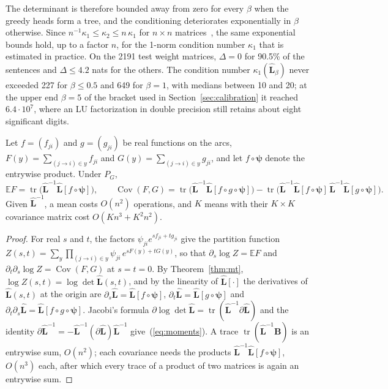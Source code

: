 \documentclass[mathematics,article,submit,pdftex,oneauthor]{Definitions/mdpi}
\newcommand{\E}{\mathbb E}
\newcommand{\Lh}{\hat{\mathbf L}}
\newcommand{\Cov}{\operatorname{Cov}}
\newcommand{\tr}{\operatorname{tr}}
\begin{document}
The determinant is therefore bounded away from zero for every $\beta$ when the greedy heads form a tree, and the conditioning deteriorates exponentially in $\beta$ otherwise.
Since $n^{-1}\kappa_1\leqslant\kappa_2\leqslant n\,\kappa_1$ for $n\times n$ matrices~\cite{Higham2002}, the same exponential bounds hold, up to a factor $n$, for the 1-norm condition number $\kappa_1$ that is estimated in practice.
On the 2191 test weight matrices, $\Delta=0$ for 90.5\% of the sentences and $\Delta\leqslant4.2$ nats for the others.
The condition number $\kappa_1(\Lh_\beta)$ never exceeded 227 for $\beta\leqslant0.5$ and 649 for $\beta=1$, with medians between 10 and 20; at the upper end $\beta=5$ of the bracket used in Section~\ref{sec:calibration} it reached $6.4\cdot10^{7}$, where an LU factorization in double precision still retains about eight significant digits.

\begin{Proposition}\label{prop:moments}
Let $f=(f_{ji})$ and $g=(g_{ji})$ be real functions on the arcs, $F(y)=\sum_{(j\to i)\in y}f_{ji}$ and $G(y)=\sum_{(j\to i)\in y}g_{ji}$, and let $f\circ\boldsymbol\psi$ denote the entrywise product.
Under $P_G$,
\begin{equation}\label{eq:moments}
\E F=\tr\bigl(\Lh^{-1}\Lh[f\circ\boldsymbol\psi]\bigr),\qquad
\Cov(F,G)=\tr\bigl(\Lh^{-1}\Lh[f\circ g\circ\boldsymbol\psi]\bigr)-\tr\bigl(\Lh^{-1}\Lh[f\circ\boldsymbol\psi]\,\Lh^{-1}\Lh[g\circ\boldsymbol\psi]\bigr).
\end{equation}
Given $\Lh^{-1}$, a mean costs $O(n^2)$ operations, and $K$ means with their $K\times K$ covariance matrix cost $O(Kn^3+K^2n^2)$.
\end{Proposition}
\begin{proof}
For real $s$ and $t$, the factors $\psi_{ji}e^{sf_{ji}+tg_{ji}}$ give the partition function $Z(s,t)=\sum_y\prod_{(j\to i)\in y}\psi_{ji}\,e^{sF(y)+tG(y)}$, so that $\partial_s\log Z=\E F$ and $\partial_t\partial_s\log Z=\Cov(F,G)$ at $s=t=0$.
By Theorem~\ref{thm:mt}, $\log Z(s,t)=\log\det\Lh(s,t)$, and by the linearity of $\Lh[\cdot]$ the derivatives of $\Lh(s,t)$ at the origin are $\partial_s\Lh=\Lh[f\circ\boldsymbol\psi]$, $\partial_t\Lh=\Lh[g\circ\boldsymbol\psi]$ and $\partial_t\partial_s\Lh=\Lh[f\circ g\circ\boldsymbol\psi]$.
Jacobi's formula $\partial\log\det\Lh=\tr(\Lh^{-1}\partial\Lh)$ and the identity $\partial\Lh^{-1}=-\Lh^{-1}(\partial\Lh)\Lh^{-1}$ give~(\ref{eq:moments}).
A trace $\tr(\Lh^{-1}\mathbf B)$ is an entrywise sum, $O(n^2)$; each covariance needs the products $\Lh^{-1}\Lh[f\circ\boldsymbol\psi]$, $O(n^3)$ each, after which every trace of a product of two matrices is again an entrywise sum.
\end{proof}
\end{document}

